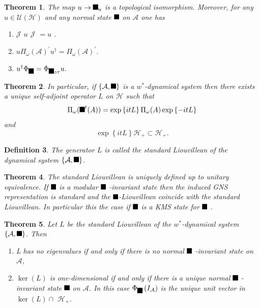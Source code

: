 \documentclass[aps,preprint]{revtex4}%
\providecommand{\U}[1]{\protect\rule{.1in}{.1in}}
\newtheorem{theorem}{Theorem}
\newtheorem{definition}[theorem]{Definition}
\begin{document}
\begin{theorem}
The map $u\rightarrow\U{3c4} _{u}$ is a topological isomorphism. Moreover, for
any $u\in\mathcal{U}\left(  \mathcal{H}\right)  $ and \emph{any normal state}
$\U{3c9} $ on $\mathcal{A}$ one has

\begin{enumerate}
\item $\mathcal{J}$ $u$ $\mathcal{J}$ $=u$ .

\item $u\Pi_{\omega}(\mathcal{A})^{\prime}u^{\dagger}=\Pi_{\omega}%
(\mathcal{A})^{\prime}$.

\item $u^{\dagger}\Phi_{\U{3c9} }=\Phi_{\U{3c9} \circ\tau}u.$
\end{enumerate}
\end{theorem}

\begin{theorem}
In particular, if $\left\{  \mathcal{A},\U{3c4} \right\}  $ is a $w^{\ast}%
$-dynamical system then there exists a unique self-adjoint operator $L$ on
$\mathcal{H}$ such that
\begin{equation}
\Pi_{\omega}(\U{3c4} ^{t}(A))=\exp\left\{  itL\right\}  \Pi_{\omega}%
(A)\exp\left\{  -itL\right\}
\end{equation}
and
\begin{equation}
\exp\left\{  itL\right\}  \mathcal{H}_{+}\subset\mathcal{H}_{+}.
\end{equation}

\end{theorem}

\begin{definition}
The generator $L$ is called the \emph{standard Liouvillean} of the dynamical
system $\left\{  \mathcal{A},\U{3c4} \right\}  $.
\end{definition}

\begin{theorem}
The standard Liouvillean is uniquely defined up to unitary equivalence. If
$\U{3c9} $ is a modular $\U{3c4} $ -invariant state then the induced GNS
representation is standard and the $\U{3c9} $-Liouvillean coincide with the
standard Liouvillean. In particular this the case if $\U{3c9} $ is a
\emph{KMS} state for $\U{3c4} $ .
\end{theorem}

\begin{theorem}
Let $L$ be the standard Liouvillean of the $w^{\ast}$-dynamical system
$\left\{  \mathcal{A},\U{3c4} \right\}  $. Then

\begin{enumerate}
\item L has no eigenvalues if and only if there is no normal $\U{3c4} $
-invariant state on $\mathcal{A}$,

\item $\ker(L)$ is one-dimensional if and only if there is a unique normal
$\U{3c4} $ -invariant state $\U{3c9} $ on $\mathcal{A}$. In this case
$\Phi_{\U{3c9} }\left(  I_{\mathcal{A}}\right)  $ is the unique unit vector in
$\ker(L)\cap$ $\mathcal{H}_{+}$.
\end{enumerate}
\end{theorem}
\end{document}
